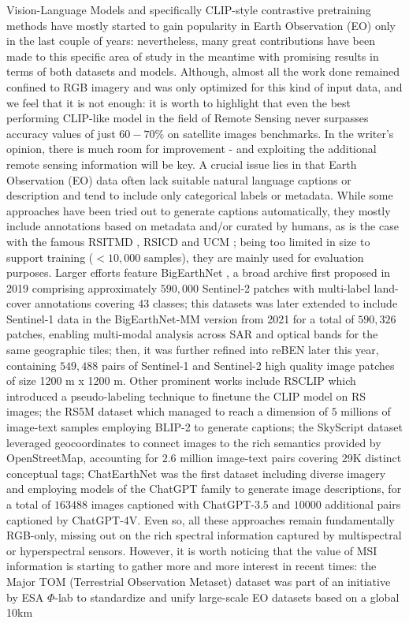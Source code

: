 \documentclass[a4paper, oneside, english]{sapthesis} %
\begin{document}
Vision-Language Models and specifically CLIP-style contrastive pretraining methods have mostly started to gain popularity in Earth Observation (EO) only in the last couple of years: nevertheless, many great contributions have been made to this specific area of study in the meantime with promising results in terms of both datasets and models. Although, almost all the work done remained confined to RGB imagery and was only optimized for this kind of input data, and we feel that it is not enough: it is worth to highlight that even the best performing CLIP-like model in the field of Remote Sensing never surpasses accuracy values of just $60-70\%$ on satellite images benchmarks. In the writer's opinion, there is much room for improvement - and exploiting the additional remote sensing information will be key. A crucial issue lies in that Earth Observation (EO) data often lack suitable natural language captions or description and tend to include only categorical labels or metadata. While some approaches have been tried out to generate captions automatically, they mostly include annotations based on metadata and/or curated by humans, as is the case with the famous RSITMD \cite{yuan2022exploring}, RSICD \cite{lu2017exploring} and UCM \cite{yang2010bag}; being too limited in size to support training ($< 10,000$ samples), they are mainly used for evaluation purposes. Larger efforts feature BigEarthNet \cite{sumbul2019bigearthnet}, a broad archive first proposed in 2019 comprising approximately $590,000$ Sentinel‑2 patches with multi-label land-cover annotations covering 43 classes; this datasets was later extended to include Sentinel‑1 data in the BigEarthNet‑MM version from 2021 \cite{sumbul2021bignearthnetmm} for a total of $590,326$ patches, enabling multi-modal analysis across SAR and optical bands for the same geographic tiles; then, it was further refined into reBEN \cite{clasen2024reben} later this year, containing $549,488$ pairs of Sentinel-1 and Sentinel-2 high quality image patches of size 1200 m x 1200 m. Other prominent works include RSCLIP \cite{li2023rs} which introduced a pseudo-labeling technique to finetune the CLIP model on RS images; the RS5M dataset \cite{zhang2024rs5m} which managed to reach a dimension of $5$ millions of image-text samples employing BLIP-2 \cite{li2023blip} to generate captions; the SkyScript dataset \cite{wang2024skyscript} leveraged geocoordinates to connect images to the rich semantics provided by OpenStreetMap, accounting for $2.6$ million image-text pairs covering 29K distinct conceptual tags; ChatEarthNet \cite{yuan2024chatearthnet} was the first dataset including diverse imagery and employing models of the ChatGPT family to generate image descriptions, for a total of $163488$ images captioned with ChatGPT-3.5 and $10000$ additional pairs captioned by ChatGPT-4V. Even so, all these approaches remain fundamentally RGB-only, missing out on the rich spectral information captured by multispectral or hyperspectral sensors. However, it is worth noticing that the value of MSI information is starting to gather more and more interest in recent times: the Major TOM (Terrestrial Observation Metaset) dataset \cite{francis2024major} was part of an initiative by ESA $\Phi$-lab to standardize and unify large-scale EO datasets based on a global 10km 
\end{document}
